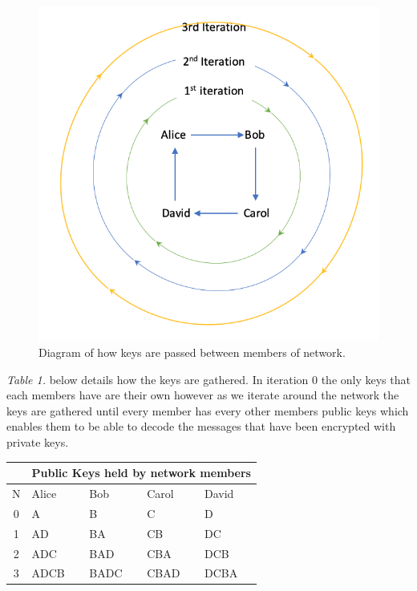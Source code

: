 \documentclass[a4paper, twoside, 11pt]{article}
\begin{document}
\begin{figure}[H]
	\centering
	\includegraphics[scale=0.8]{Images/KeyIteration.png}
	\caption{Diagram of how keys are passed between members of network.}
\end{figure}

\textit{Table 1.} below details how the keys are gathered. In iteration 0 the only keys that each
members have are their own however as we iterate around the network the keys are gathered until every member
has every other members public keys which enables them to be able to decode the messages that have been encrypted with private keys. 

\begin{center}
	\begin{tabular}{ |c|l|l|l|l| } 
	 \hline
	 \multicolumn{1}{|c|}{}& \multicolumn {4}{|c|}{Public Keys held by network members} \\
	 \hline
   N & Alice & Bob & Carol & David \\
   \hline
   0 & A & B & C & D \\
   1 & AD & BA & CB & DC \\
   2 & ADC & BAD & CBA & DCB \\
   3 & ADCB & BADC & CBAD & DCBA \\
	 \hline
	\end{tabular}
\end{center}
\end{document}
